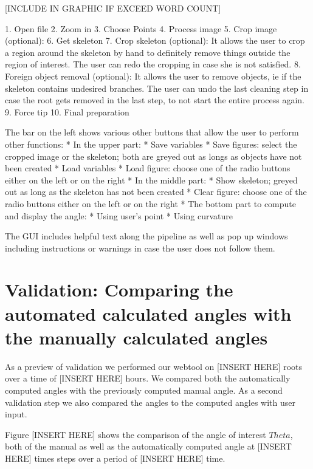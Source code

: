 [INCLUDE IN GRAPHIC IF EXCEED WORD COUNT]

1. Open file
2. Zoom in
3. Choose Points
4. Process image
5. Crop image (optional): 
6. Get skeleton
7. Crop skeleton (optional): It allows the user to crop a region around the skeleton by hand to definitely remove things outside the region of interest. The user can redo the cropping in case she is not satisfied. 
8. Foreign object removal (optional): It allows the user to remove objects, ie if the skeleton contains undesired branches. The user can undo the last cleaning step in case the root gets removed in the last step, to not start the entire process again. 
9. Force tip
10. Final preparation

The bar on the left shows various other buttons that allow the user to perform other functions:
* In the upper part: 
* Save variables
* Save figures: select the cropped image or the skeleton; both are greyed out as longs as objects have not been created
* Load variables
* Load figure: choose one of the radio buttons either on the left or on the right
* In the middle part: 
* Show skeleton; greyed out as long as the skeleton has not been created
* Clear figure: choose one of the radio buttons either on the left or on the right
* The bottom part to compute and display the angle:
* Using user’s point
* Using curvature

The GUI includes helpful text along the pipeline as well as pop up windows including instructions or warnings in case the user does not follow them. 


\section{Validation: Comparing the automated calculated angles with the manually calculated angles}

As a preview of validation we performed our webtool on [INSERT HERE] roots over a time of [INSERT HERE] hours. We compared both the automatically computed angles with the previously computed manual angle. As a second validation step we also compared the angles to the computed angles with user input.

Figure [INSERT HERE] shows the comparison of the angle of interest \( Theta \), both of the manual as well as the automatically computed angle at [INSERT HERE] times steps over a period of [INSERT HERE] time.

